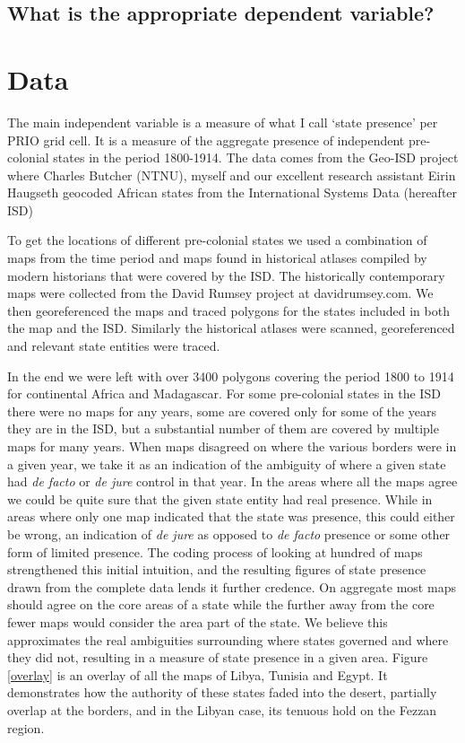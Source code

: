 \documentclass[12pt]{article}
\begin{document}
\subsection{What is the appropriate dependent variable?}

\section{Data}

The main independent variable is a measure of what I call `state presence' per
PRIO grid cell. It is a measure of the aggregate presence of independent
pre-colonial states in the period 1800-1914. The data comes from the Geo-ISD
project where Charles Butcher (NTNU), myself and our excellent research
assistant Eirin Haugseth geocoded African states from the International Systems
Data (hereafter ISD) \citep{Griffiths2013}

To get the locations of different pre-colonial states we used a combination of
maps from the time period and maps found in historical atlases compiled by
modern historians that were covered by the ISD. The historically contemporary
maps were collected from the David Rumsey project at davidrumsey.com. We then
georeferenced the maps and traced polygons for the states included in both the
map and the ISD. Similarly the historical atlases were scanned, georeferenced
and relevant state entities were traced.

In the end we were left with over 3400 polygons covering the period 1800 to 1914
for continental Africa and Madagascar. For some pre-colonial states in the ISD
there were no maps for any years, some are covered only for some of the years
they are in the ISD, but a substantial number of them are covered by multiple
maps for many years. When maps disagreed on where the various borders were in a
given year, we take it as an indication of the ambiguity of where a given state
had \emph{de facto} or \emph{de jure} control in that year. In the areas where
all the maps agree we could be quite sure that the given state entity had real
presence.  While in areas where only one map indicated that the state was
presence, this could either be wrong, an indication of \emph{de jure} as opposed
to \emph{de facto} presence or some other form of limited presence. The coding
process of looking at hundred of maps strengthened this initial intuition, and
the resulting figures of state presence drawn from the complete data lends it
further credence. On aggregate most maps should agree on the core areas of a
state while the further away from the core fewer maps would consider the area
part of the state. We believe this approximates the real ambiguities surrounding
where states governed and where they did not, resulting in a measure of state
presence in a given area. Figure \ref{overlay} is an overlay of all the maps of
Libya, Tunisia and Egypt. It demonstrates how the authority of these states
faded into the desert, partially overlap at the borders, and in the Libyan case,
its tenuous hold on the Fezzan region. 
\end{document}
